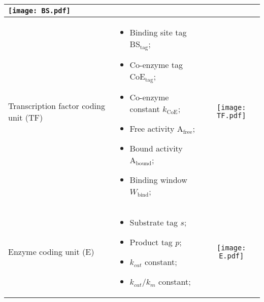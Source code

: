 \begin{table}[!ht]
\begin{adjustwidth}{0in}{0in}
\begin{tabular}{ | m{} | m{} | c |}
\begin{minipage}{.1\textwidth}
\centering
\texttt{[image: BS.pdf]}
\end{minipage}
\\
\hline
Transcription factor coding unit (TF)
& 
\begin{itemize}
\item[] Binding site tag $\text{BS}_\text{tag}$;
\item[] Co-enzyme tag $\text{CoE}_\text{tag}$;
\item[] Co-enzyme constant $k_{\text{CoE}}$;
\item[] Free activity $\text{A}_{\text{free}}$;
\item[] Bound activity $\text{A}_{\text{bound}}$;
\item[] Binding window $W_\text{bind}$;
\end{itemize}
&
\begin{minipage}{.1\textwidth}
\centering
\texttt{[image: TF.pdf]}
\end{minipage}
\\
\hline
Enzyme coding unit (E)
& 
\begin{itemize}
\item[] Substrate tag $s$;
\item[] Product tag $p$;
\item[] $k_{cat}$ constant;
\item[] $k_{cat}/k_m$ constant;
\end{itemize}
&
\begin{minipage}{.1\textwidth}
\centering
\texttt{[image: E.pdf]}
\end{minipage}
\\
\hline
\end{tabular}
\begin{flushleft}

\end{flushleft}
\label{table:part2:genetic_units}
\end{adjustwidth}
\end{table}
